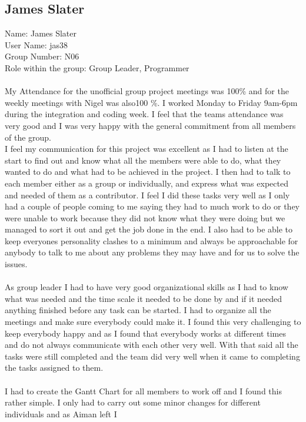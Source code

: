 \documentclass[titlepage]{article}
\begin{document}
{{\subsection {James Slater}
\normalsize{Name: James Slater}
\\
\normalsize{User Name: jas38}
\\
\normalsize{Group Number: N06}
\\
\normalsize{Role within the group: Group Leader, Programmer}
\\
\\
\normalsize {My Attendance for the unofficial group project meetings was 100\% and for the weekly meetings with
Nigel was also100 \%. I worked Monday to Friday 9am-6pm during
the integration and coding week. I feel that the teams attendance was very good and I was
very happy with the general commitment from all members of the group.
\\ 
I feel my communication for this project was excellent as I had to listen at
the start to find out and know what all the members were able to do, what they wanted
to do and what had to be achieved in the project. I then had to talk to each member either as a
group or individually, and express what was expected and needed of them as a contributor. I feel I did
these tasks very well as I only had a couple of people coming to me saying they had to
much work to do or they were unable to work because they did not know what they were doing but
we managed to sort it out and get the job done in the end. I also had to be able to keep
everyones personality clashes to a minimum and always be approachable for anybody to
talk to me about any problems they may have and for us to solve the issues.
\\
\\
As group leader I had to have very good organizational skills as I had
to know what was needed and the time scale it needed to be done by and if it needed
anything finished before any task can be started. I had to organize all the meetings and
make sure everybody could make it. I found this very challenging to keep everybody happy
and as I found that everybody works at different times and do not
always communicate with each other very well. With that said all the tasks were still completed and
the team did very well when it came to completing the tasks assigned to them.
\\
\\
I had to create the Gantt Chart for all members to work off and I found this rather
simple. I only had to carry out some minor changes for different individuals and as Aiman left I
}}}
\end{document}
